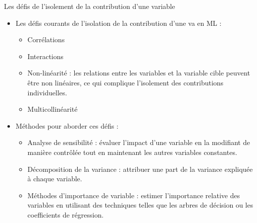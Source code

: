 \documentclass{beamer}
\begin{document}
\begin{frame}{Les défis de l'isolement de la contribution d'une variable}
	\begin{itemize}
		\item Les défis courants de l'isolation de la contribution d'une va en ML :
		\begin{itemize}
			\item Corrélations 
			\item Interactions 
			\item Non-linéarité : les relations entre les variables et la variable cible peuvent être non linéaires, ce qui complique l'isolement des contributions individuelles.
			\item Multicollinéarité
		\end{itemize}
		\item Méthodes pour aborder ces défis :
		\begin{itemize}
			\item Analyse de sensibilité : évaluer l'impact d'une variable en la modifiant de manière contrôlée tout en maintenant les autres variables constantes.
			\item Décomposition de la variance : attribuer une part de la variance expliquée à chaque variable.
			\item Méthodes d'importance de variable : estimer l'importance relative des variables en utilisant des techniques telles que les arbres de décision ou les coefficients de régression.
		\end{itemize}
	\end{itemize}
\end{frame}
\end{document}
